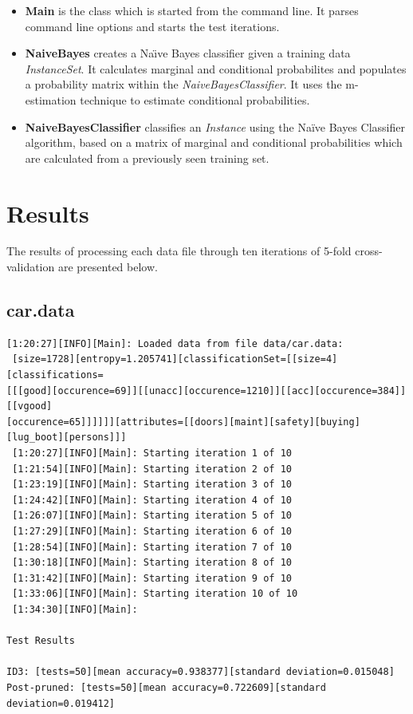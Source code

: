 \documentclass[10pt]{report}
\begin{document}
\begin{itemize}
\item \textbf{Main} is the class which is started from the command
  line. It parses command line options and starts the test iterations.

\item \textbf{NaiveBayes} creates a Na\"{\i}ve Bayes classifier
  given a training data \textit{InstanceSet}. It calculates marginal
  and conditional probabilites and populates a probability matrix
  within the \textit{NaiveBayesClassifier}. It uses the m-estimation
  technique to estimate conditional probabilities.

\item \textbf{NaiveBayesClassifier} classifies an \textit{Instance}
  using the Na\"{i}ve Bayes Classifier algorithm, based on a matrix of
  marginal and conditional probabilities which are calculated from a
  previously seen training set.

\end{itemize}


\section{Results}
\label{sec:results}
The results of processing each data file through ten iterations of
5-fold cross-validation are presented below. 

\subsection*{car.data}
{\small
\begin{verbatim}
[1:20:27][INFO][Main]: Loaded data from file data/car.data:
 [size=1728][entropy=1.205741][classificationSet=[[size=4][classifications=
[[[good][occurence=69]][[unacc][occurence=1210]][[acc][occurence=384]][[vgood]
[occurence=65]]]]]][attributes=[[doors][maint][safety][buying][lug_boot][persons]]]
 [1:20:27][INFO][Main]: Starting iteration 1 of 10
 [1:21:54][INFO][Main]: Starting iteration 2 of 10
 [1:23:19][INFO][Main]: Starting iteration 3 of 10
 [1:24:42][INFO][Main]: Starting iteration 4 of 10
 [1:26:07][INFO][Main]: Starting iteration 5 of 10
 [1:27:29][INFO][Main]: Starting iteration 6 of 10
 [1:28:54][INFO][Main]: Starting iteration 7 of 10
 [1:30:18][INFO][Main]: Starting iteration 8 of 10
 [1:31:42][INFO][Main]: Starting iteration 9 of 10
 [1:33:06][INFO][Main]: Starting iteration 10 of 10
 [1:34:30][INFO][Main]:

Test Results

ID3: [tests=50][mean accuracy=0.938377][standard deviation=0.015048]
Post-pruned: [tests=50][mean accuracy=0.722609][standard deviation=0.019412]
\end{verbatim}
}
\end{document}
